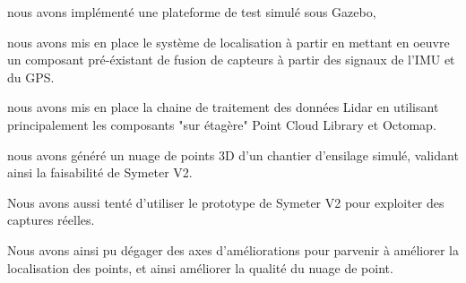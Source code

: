 \documentclass[12pt,a4paper]{report}
\begin{document}
nous avons implémenté une plateforme de test simulé sous Gazebo,

nous avons mis en place le système de localisation à partir en mettant en oeuvre un composant pré-éxistant de fusion de capteurs à partir des signaux de l'IMU et du GPS.

nous avons mis en place la chaine de traitement des données Lidar en utilisant principalement les composants "sur étagère" Point Cloud Library et Octomap.

nous avons généré un nuage de points 3D d'un chantier d'ensilage simulé, validant ainsi la faisabilité de Symeter V2.

Nous avons aussi tenté d'utiliser le prototype de Symeter V2 pour exploiter des captures réelles.

Nous avons ainsi pu dégager des axes d'améliorations pour parvenir à améliorer la localisation des points, et ainsi améliorer la qualité du nuage de point.
\end{document}
